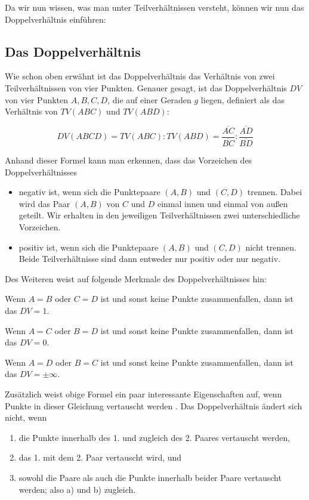 \documentclass[12pt,a4paper]{article}
\begin{document}
Da wir nun wissen, was man unter Teilverhältnissen versteht, können wir nun das Doppelverhältnis einführen:

\subsection{Das Doppelverhältnis}

Wie schon oben erwähnt ist das Doppelverhältnis das Verhältnis von zwei Teilverhältnissen von vier Punkten. Genauer gesagt, ist das Doppelverhältnis $DV$ von vier Punkten $A, B, C, D$, die auf einer Geraden $g$ liegen, definiert als das Verhältnis von $TV(A B C)$ und $TV(A B D)$:

\[DV(A B C D) = TV(A B C) : TV(A B D) = \dfrac{\overline{A C}}{\overline{B C}} : \dfrac{\overline{A D}}{\overline{B D}}\]

Anhand dieser Formel kann man erkennen, dass das Vorzeichen des Doppelverhältnisses
\begin{itemize}
\item negativ ist, wenn sich die Punktepaare $(A, B)$ und $(C, D)$ trennen. Dabei wird das Paar $(A, B)$ von $C$ und $D$ einmal innen und einmal von außen geteilt. Wir erhalten in den jeweiligen Teilverhältnissen zwei unterschiedliche Vorzeichen.
\item positiv ist, wenn sich die Punktepaare $(A, B)$ und $(C, D)$ nicht trennen. Beide Teilverhältnisse sind dann entweder nur positiv oder nur negativ.
\end{itemize}

Des Weiteren weist \citep{projektiveGeometrie} auf folgende Merkmale des Doppelverhältnisses hin:

Wenn $A = B$ oder $C = D$ ist und sonst keine Punkte zusammenfallen, dann ist das $DV = 1$.

Wenn $A = C$ oder $B = D$ ist und sonst keine Punkte zusammenfallen, dann ist das $DV = 0$.

Wenn $A = D$ oder $B = C$ ist und sonst keine Punkte zusammenfallen, dann ist das $DV = \pm\infty$.

Zusätzlich weist obige Formel ein paar interessante Eigenschaften auf, wenn Punkte in dieser Gleichung vertauscht werden \citep[vgl.][S.~77]{projektiveGeometrie}. Das Doppelverhältnis ändert sich nicht, wenn

\begin{enumerate}[label={\alph*)}] 
\item die Punkte innerhalb des 1. und zugleich des 2. Paares vertauscht werden,
\item das 1. mit dem 2. Paar vertauscht wird, und
\item sowohl die Paare als auch die Punkte innerhalb beider Paare vertauscht werden; also a) und b) zugleich.
\end{enumerate}
\end{document}
